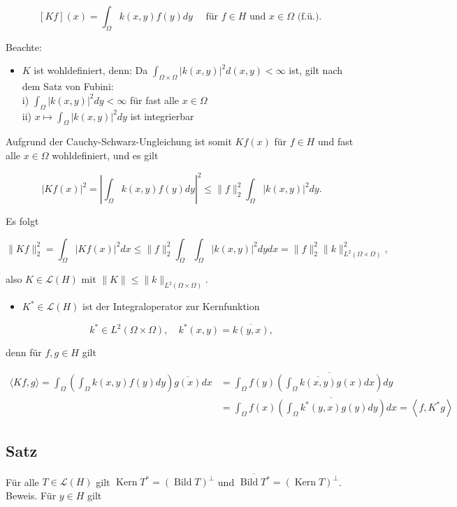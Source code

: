 \documentclass[10pt, letterpaper]{article}
\begin{document}
$$
[K f](x)=\int_{\Omega} k(x, y) f(y) d y \quad \text { für } f \in H \text { und } x \in \Omega \text { (f.ü.). }
$$

Beachte:

\begin{itemize}
  \item $K$ ist wohldefiniert, denn: Da $\int_{\Omega \times \Omega}|k(x, y)|^{2} d(x, y)<\infty$ ist, gilt nach dem Satz von Fubini:\\
i) $\int_{\Omega}|k(x, y)|^{2} d y<\infty$ für fast alle $x \in \Omega$\\
ii) $x \mapsto \int_{\Omega}|k(x, y)|^{2} d y$ ist integrierbar
\end{itemize}

Aufgrund der Cauchy-Schwarz-Ungleichung ist somit $K f(x)$ für $f \in H$ und fast alle $x \in \Omega$ wohldefiniert, und es gilt

$$
|K f(x)|^{2}=\left|\int_{\Omega} k(x, y) f(y) d y\right|^{2} \leq\|f\|_{2}^{2} \int_{\Omega}|k(x, y)|^{2} d y .
$$

Es folgt

$$
\|K f\|_{2}^{2}=\int_{\Omega}|K f(x)|^{2} d x \leq\|f\|_{2}^{2} \int_{\Omega} \int_{\Omega}|k(x, y)|^{2} d y d x=\|f\|_{2}^{2}\|k\|_{L^{2}(\Omega \times \Omega)}^{2},
$$

also $K \in \mathcal{L}(H)$ mit $\|K\| \leq\|k\|_{L^{2}(\Omega \times \Omega)}$.

\begin{itemize}
  \item $K^{*} \in \mathcal{L}(H)$ ist der Integraloperator zur Kernfunktion
\end{itemize}

$$
k^{*} \in L^{2}(\Omega \times \Omega), \quad k^{*}(x, y)=\overline{k(y, x)},
$$

denn für $f, g \in H$ gilt

$$
\begin{aligned}
\langle K f, g\rangle=\int_{\Omega}\left(\int_{\Omega} k(x, y) f(y) d y\right) \overline{g(x)} d x & =\int_{\Omega} f(y) \overline{\left(\int_{\Omega} \overline{k(x, y)} g(x) d x\right)} d y \\
& =\int_{\Omega} f(x) \overline{\left(\int_{\Omega} k^{*}(y, x) g(y) d y\right)} d x=\left\langle f, K^{*} g\right\rangle
\end{aligned}
$$

\subsection*{Satz}
Für alle $T \in \mathcal{L}(H)$ gilt $\operatorname{Kern} T^{*}=(\operatorname{Bild} T)^{\perp}$ und $\overline{\operatorname{Bild} T^{*}}=(\operatorname{Kern} T)^{\perp}$.\\
Beweis. Für $y \in H$ gilt
\end{document}
